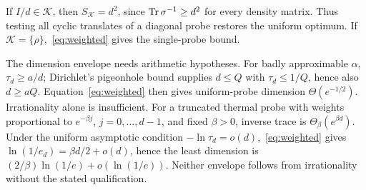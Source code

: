 If $I/d\in\mathcal K$, then $S_{\mathcal K}=d^2$, since $\operatorname{Tr}\sigma^{-1}\ge d^2$ for every density matrix. Thus testing all cyclic translates of a diagonal probe restores the uniform optimum. If $\mathcal K=\{\rho\}$,~\eqref{eq:weighted} gives the single-probe bound.

The dimension envelope needs arithmetic hypotheses. For badly approximable $\alpha$, $\tau_d\ge a/d$; Dirichlet's pigeonhole bound supplies $d\le Q$ with $\tau_d\le1/Q$, hence also $d\ge aQ$. Equation~\eqref{eq:weighted} then gives uniform-probe dimension $\Theta(e^{-1/2})$. Irrationality alone is insufficient. For a truncated thermal probe with weights proportional to $e^{-\beta j}$, $j=0,\ldots,d-1$, and fixed $\beta>0$, inverse trace is $\Theta_\beta(e^{\beta d})$. Under the uniform asymptotic condition $-\ln\tau_d=o(d)$,~\eqref{eq:weighted} gives $\ln(1/e_d)=\beta d/2+o(d)$, hence the least dimension is $(2/\beta)\ln(1/e)+o(\ln(1/e))$. Neither envelope follows from irrationality without the stated qualification.
